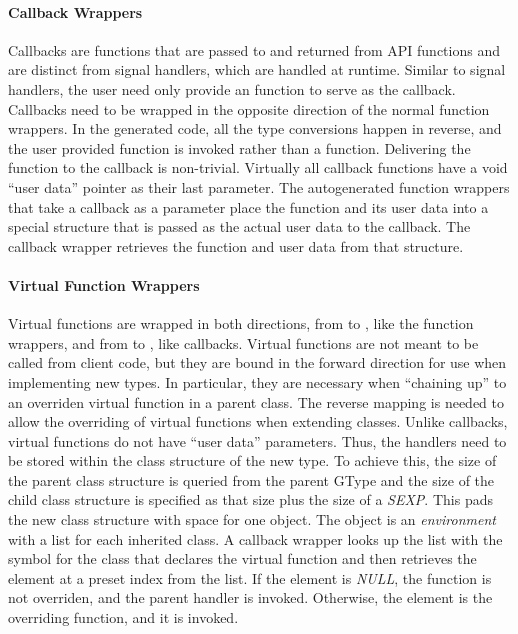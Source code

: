 \documentclass[article]{jss}
\begin{document}
\paragraph{Callback Wrappers}

Callbacks are functions that are passed to and returned from API functions
and are distinct from signal handlers, which are handled at runtime. Similar
to signal handlers, the user need only provide an  function
to serve as the callback. Callbacks need to be wrapped in the opposite direction 
of the normal function wrappers.
In the generated code, all the type conversions happen in reverse, and the
user provided  function is invoked rather than a  function.
Delivering the  function to the callback is non-trivial.
Virtually all callback functions have a void ``user data'' pointer as their
last parameter. The autogenerated function wrappers that take a callback as
a parameter place the  function and its user data into a special
structure that is passed as the actual user data to the  callback.
The callback wrapper retrieves the  function and user data from
that structure.

\paragraph{Virtual Function Wrappers}

Virtual functions are wrapped in both directions, from  to ,
like the function wrappers, and from  to , like callbacks. 
Virtual functions are not meant to be called from client code, but they are
bound in the forward direction for use when implementing new types. In 
particular, they are necessary when ``chaining up'' to an overriden virtual 
function in a parent class. The reverse mapping is needed to allow the overriding
of virtual functions when extending  classes. Unlike callbacks,
virtual functions do not have ``user data'' parameters. Thus, the handlers
need to be stored within the class structure of the new type. To achieve this,
the size of the parent class structure is queried from the parent GType and 
the size of the child class structure is specified as that size plus the 
size of a \emph{SEXP}. This pads the new class structure with space for one
 object. The object is an \emph{environment} with a list for each 
inherited class. A callback wrapper looks up the list with the symbol
for the class that declares the virtual function and then retrieves the element
at a preset index from the list. If the element is \emph{NULL}, the function is
not overriden, and the parent handler is invoked. Otherwise, the element
is the overriding  function, and it is invoked.
\end{document}
